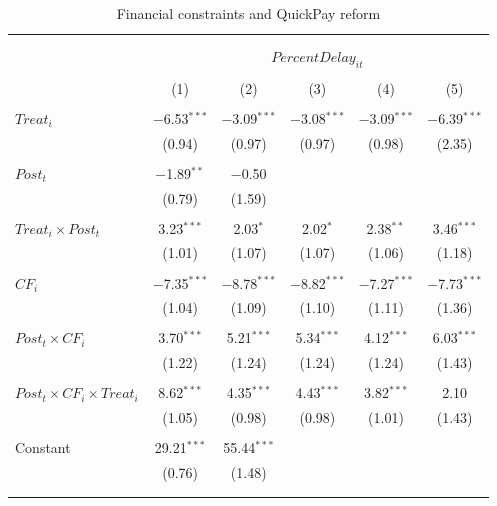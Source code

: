 \documentclass[
]{article}
\begin{document}
\begin{table}[H] \centering 
  \caption{Financial constraints and QuickPay reform} 
  \label{} 
\small 
\begin{tabular}{@{\extracolsep{-2pt}}lccccc} 
\\[-1.8ex]\hline 
\hline \\[-1.8ex] 
\\[-1.8ex] & \multicolumn{5}{c}{$PercentDelay_{it}$  } \\ 
\\[-1.8ex] & (1) & (2) & (3) & (4) & (5)\\ 
\hline \\[-1.8ex] 
 $Treat_i$ & $-$6.53$^{***}$ & $-$3.09$^{***}$ & $-$3.08$^{***}$ & $-$3.09$^{***}$ & $-$6.39$^{***}$ \\ 
  & (0.94) & (0.97) & (0.97) & (0.98) & (2.35) \\ 
  & & & & & \\ 
 $Post_t$ & $-$1.89$^{**}$ & $-$0.50 &  &  &  \\ 
  & (0.79) & (1.59) &  &  &  \\ 
  & & & & & \\ 
 $Treat_i \times Post_t$ & 3.23$^{***}$ & 2.03$^{*}$ & 2.02$^{*}$ & 2.38$^{**}$ & 3.46$^{***}$ \\ 
  & (1.01) & (1.07) & (1.07) & (1.06) & (1.18) \\ 
  & & & & & \\ 
 $CF_i$ & $-$7.35$^{***}$ & $-$8.78$^{***}$ & $-$8.82$^{***}$ & $-$7.27$^{***}$ & $-$7.73$^{***}$ \\ 
  & (1.04) & (1.09) & (1.10) & (1.11) & (1.36) \\ 
  & & & & & \\ 
 $Post_t \times CF_i$ & 3.70$^{***}$ & 5.21$^{***}$ & 5.34$^{***}$ & 4.12$^{***}$ & 6.03$^{***}$ \\ 
  & (1.22) & (1.24) & (1.24) & (1.24) & (1.43) \\ 
  & & & & & \\ 
 $Post_t \times CF_i \times Treat_i$ & 8.62$^{***}$ & 4.35$^{***}$ & 4.43$^{***}$ & 3.82$^{***}$ & 2.10 \\ 
  & (1.05) & (0.98) & (0.98) & (1.01) & (1.43) \\ 
  & & & & & \\ 
 Constant & 29.21$^{***}$ & 55.44$^{***}$ &  &  &  \\ 
  & (0.76) & (1.48) &  &  &  \\ 
  & & & & & \\ 
\hline \\[-1.8ex] 

\end{tabular}
\end{table}
\end{document}
